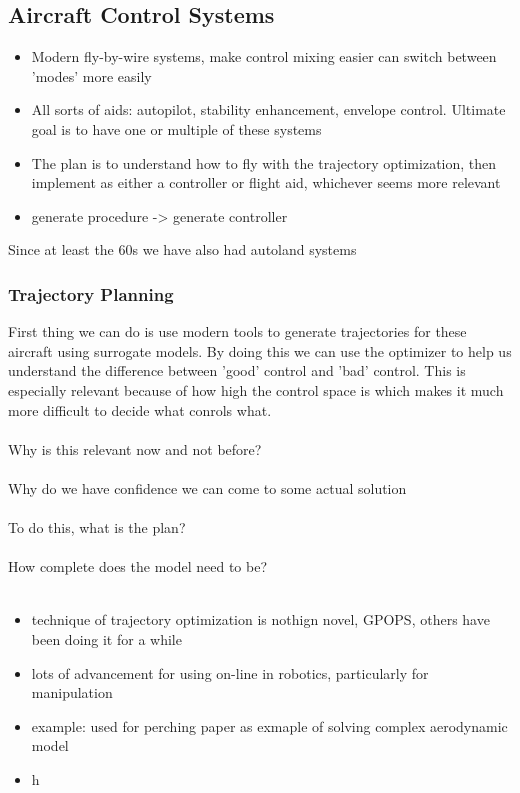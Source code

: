 \subsection{Aircraft Control Systems} \label{sec:control}
\begin{itemize}
	\item Modern fly-by-wire systems, make control mixing easier can switch between 'modes' more easily
	\item All sorts of aids: autopilot, stability enhancement, envelope control. Ultimate goal is to have one or multiple of these systems
	\item The plan is to understand how to fly with the trajectory optimization, then implement as either a controller or flight aid, whichever seems more relevant
	\item generate procedure -> generate controller
\end{itemize}

Since at least the 60s we have also had autoland systems

\subsubsection{Trajectory Planning} \label{ssec:trajectory-planning}
First thing we can do is use modern tools to generate trajectories for these aircraft using surrogate models. By doing this we can use the optimizer to help us understand the difference between 'good' control and 'bad' control. This is especially relevant because of how high the control space is which makes it much more difficult to decide what conrols what. \\
\\
Why is this relevant now and not before?\\
\\
Why do we have confidence we can come to some actual solution\\
\\
To do this, what is the plan?\\
\\
How complete does the model need to be?\\
\\
\begin{itemize}
	\item technique of trajectory optimization is nothign novel, GPOPS, others have been doing it for a while
	\item lots of advancement for using on-line in robotics, particularly for manipulation
	\item example: used for perching paper as exmaple of solving complex aerodynamic model
	\item h
\end{itemize}

